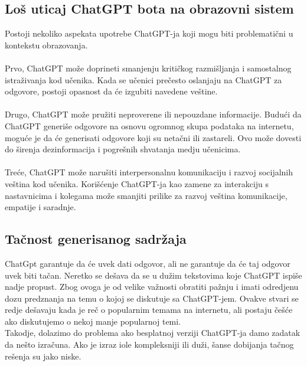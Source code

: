 \documentclass[fleqn, 12pt]{article}
\begin{document}
    \subsection{Loš uticaj ChatGPT bota na obrazovni sistem}
        \begin{text}
            Postoji nekoliko aspekata upotrebe ChatGPT-ja koji mogu biti problematični u kontekstu obrazovanja. \cite{G7}
            \\\\
            Prvo, ChatGPT može doprineti smanjenju kritičkog razmišljanja i samostalnog istraživanja kod učenika. Kada se učenici prečesto oslanjaju na ChatGPT za odgovore, postoji opasnost da će izgubiti navedene veštine. \cite{G7}
            \\\\
            Drugo, ChatGPT može pružiti neproverene ili nepouzdane informacije. Budući da ChatGPT generiše odgovore na osnovu ogromnog skupa podataka na internetu, moguće je da će generisati odgovore koji su netačni ili zastareli. Ovo može dovesti do širenja dezinformacija i pogrešnih shvatanja medju učenicima. \cite{G7}
            \\\\
            Treće, ChatGPT može narušiti interpersonalnu komunikaciju i razvoj socijalnih veština kod učenika. Korišćenje ChatGPT-ja kao zamene za interakciju s nastavnicima i kolegama može smanjiti prilike za razvoj veština komunikacije, empatije i saradnje. \cite{G7}
        \end{text}
\newpage
    \subsection{Tačnost generisanog sadržaja}
        \begin{text}
            ChatGpt garantuje da će uvek dati odgovor, ali ne garantuje da će taj odgovor uvek biti tačan. Neretko se dešava da se u dužim tekstovima koje ChatGPT ispiše nadje propust. Zbog ovoga je od velike važnosti obratiti pažnju i imati odredjenu dozu predznanja na temu o kojoj se diskutuje sa ChatGPT-jem. Ovakve stvari se redje dešavaju kada je reč o popularnim temama na internetu, ali postaju češće ako diskutujemo o nekoj manje popularnoj temi.\cite{G8}
            \\
            Takodje, dolazimo do problema ako besplatnoj verziji ChatGPT-ja damo zadatak da nešto izračuna. Ako je izraz iole kompleksniji ili duži, šanse dobijanja tačnog rešenja su jako niske.\cite{G8}
            \newline
        \end{text}
\newpage
\end{document}
